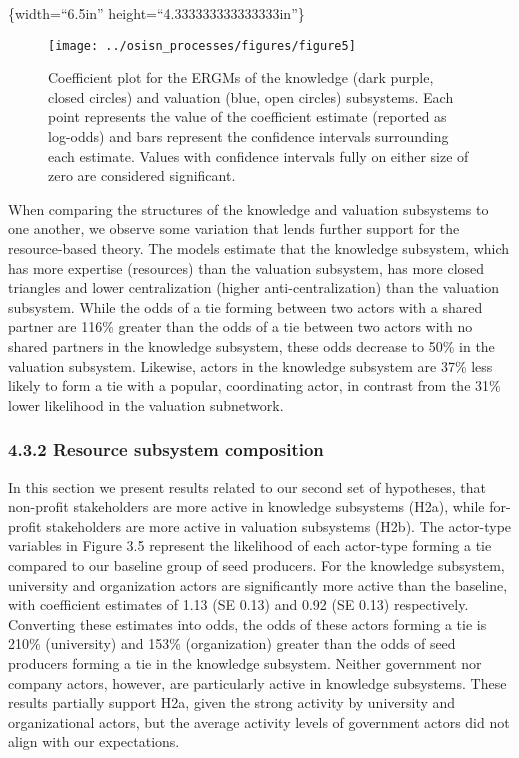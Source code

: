 \documentclass[twoside,12pt,final]{ucthesis-CA2012}
\begin{document}
\begin{ucmainmatter}
\{width=``6.5in'' height=``4.333333333333333in''\}
\begin{figure}

{\centering \texttt{[image: ../osisn\_processes/figures/figure5]} 

}

\caption{Coefficient plot for the ERGMs of the knowledge (dark purple, closed circles) and valuation (blue, open circles) subsystems. Each point represents the value of the coefficient estimate (reported as log-odds) and bars represent the confidence intervals surrounding each estimate. Values with confidence intervals fully on either size of zero are considered significant.}\label{fig:unnamed-chunk-28}
\end{figure}
When comparing the structures of the knowledge and valuation subsystems
to one another, we observe some variation that lends further support for
the resource-based theory. The models estimate that the knowledge
subsystem, which has more expertise (resources) than the valuation
subsystem, has more closed triangles and lower centralization (higher
anti-centralization) than the valuation subsystem. While the odds of a
tie forming between two actors with a shared partner are 116\% greater
than the odds of a tie between two actors with no shared partners in the
knowledge subsystem, these odds decrease to 50\% in the valuation
subsystem. Likewise, actors in the knowledge subsystem are 37\% less
likely to form a tie with a popular, coordinating actor, in contrast
from the 31\% lower likelihood in the valuation subnetwork.

\hypertarget{resource-subsystem-composition}{%
\subsubsection{4.3.2 Resource subsystem composition}\label{resource-subsystem-composition}}

In this section we present results related to our second set of
hypotheses, that non-profit stakeholders are more active in knowledge
subsystems (H2a), while for-profit stakeholders are more active in
valuation subsystems (H2b). The \textquotesingle actor-type\textquotesingle{} variables in Figure 3.5
represent the likelihood of each actor-type forming a tie compared to
our baseline group of seed producers. For the knowledge subsystem,
university and organization actors are significantly more active than
the baseline, with coefficient estimates of 1.13 (SE 0.13) and 0.92 (SE
0.13) respectively. Converting these estimates into odds, the odds of
these actors\textquotesingle{} forming a tie is 210\% (university) and 153\%
(organization) greater than the odds of seed producers forming a tie in
the knowledge subsystem. Neither government nor company actors, however,
are particularly active in knowledge subsystems. These results partially
support H2a, given the strong activity by university and organizational
actors, but the average activity levels of government actors did not
align with our expectations.


\end{ucmainmatter}
\end{document}
